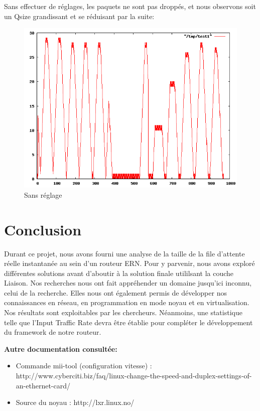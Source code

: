 \documentclass[a4paper]{article}
\begin{document}
Sans effectuer de réglages, les paquets ne sont pas droppés, et nous observons soit un Qsize grandissant et
se réduisant par la suite:
\begin{figure}[!ht]
	\centering
	\includegraphics[scale=.5]{qsize_default.png}
	\caption{\label{qsize_default} Sans réglage}
\end{figure}

\section{Conclusion}
Durant ce projet, nous avons fourni une analyse de la taille de la file d'attente
réelle instantanée au sein d'un routeur ERN. Pour y parvenir, nous avons exploré 
différentes solutions avant d'aboutir à la solution finale utililsant la couche Liaison. 
Nos recherches nous ont fait appréhender un domaine jusqu'ici inconnu,
celui de la recherche. Elles nous ont également permis de développer nos connaissances
en réseau, en programmation en mode noyau et en virtualisation. 
Nos résultats sont exploitables par les chercheurs. Néanmoins, une statistique telle que
l'Input Traffic Rate devra être établie pour compléter le développement du framework
de notre routeur.

\newpage



\textbf{Autre documentation consultée:}
\begin{itemize}
	\item Commande mii-tool (configuration vitesse) : 
	http://www.cyberciti.biz/faq/linux-change-the-speed-and-duplex-settings-of-an-ethernet-card/
	\item Source du noyau : http://lxr.linux.no/
\end{itemize}
\end{document}
